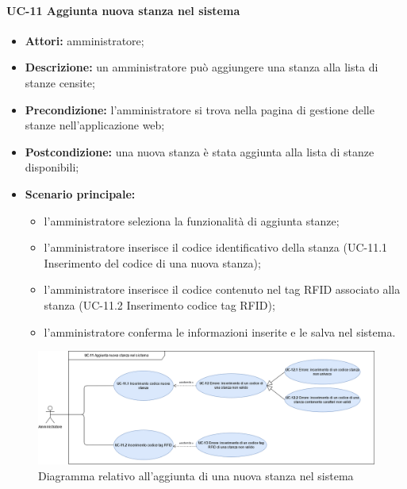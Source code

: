 \paragraph{UC-11 Aggiunta nuova stanza nel sistema}
\begin{itemize}
    \item \textbf{Attori:} amministratore;
    \item \textbf{Descrizione:} un amministratore pu\`{o} aggiungere una stanza alla lista di stanze censite;
    \item \textbf{Precondizione:} l'amministratore si trova nella pagina di gestione delle stanze nell'applicazione web;
    \item \textbf{Postcondizione:} una nuova stanza \`{e} stata aggiunta alla lista di stanze disponibili;
    \item \textbf{Scenario principale:}
    \begin{itemize}
        \item l'amministratore seleziona la funzionalità di aggiunta stanze;
        \item l'amministratore inserisce il codice identificativo della stanza (UC-11.1 Inserimento del codice di una nuova stanza);
        \item l'amministratore inserisce il codice contenuto nel tag RFID associato alla stanza (UC-11.2 Inserimento codice tag RFID);
        \item l'amministratore conferma le informazioni inserite e le salva nel sistema.
    \end{itemize}
\end{itemize}

\begin{figure}[H]
    \centering
      \includegraphics[scale=0.35]{src/CasiDUso/immagini/AggiuntaNuovaStanza.png}
    \caption{Diagramma relativo all'aggiunta di una nuova stanza nel sistema}
\end{figure}


